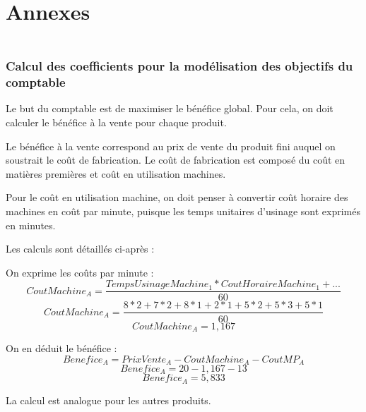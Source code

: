 \documentclass[a4paper,10pt]{article}
\begin{document}



\newpage
\part*{Annexes}
\appendix
\section{\\ Calcul des coefficients pour la modélisation des objectifs du
  comptable}

Le but du comptable est de maximiser le bénéfice global. Pour cela, on doit
calculer le bénéfice à la vente pour chaque produit.

Le bénéfice à la vente correspond au prix de vente du produit fini auquel
on soustrait le coût de fabrication. Le coût de fabrication est composé du
coût en matières premières et coût en utilisation machines.

Pour le coût en utilisation machine, on doit penser à convertir coût horaire
des machines en coût par minute, puisque les temps unitaires d'usinage sont
exprimés en minutes.

Les calculs sont détaillés ci-après :

On exprime les coûts par minute :
$$ CoutMachine_A = \frac{TempsUsinageMachine_1*CoutHoraireMachine_1 + ...}{60} $$
$$ CoutMachine_A = \frac{8*2+7*2+8*1+2*1+5*2+5*3+5*1}{60} $$
$$ CoutMachine_A = 1,167 $$

On en déduit le bénéfice :
$$ Benefice_A = PrixVente_A - CoutMachine_A - CoutMP_A $$
$$ Benefice_A = 20 - 1,167 - 13 $$
$$ Benefice_A = 5,833 $$

La calcul est analogue pour les autres produits.
\end{document}
